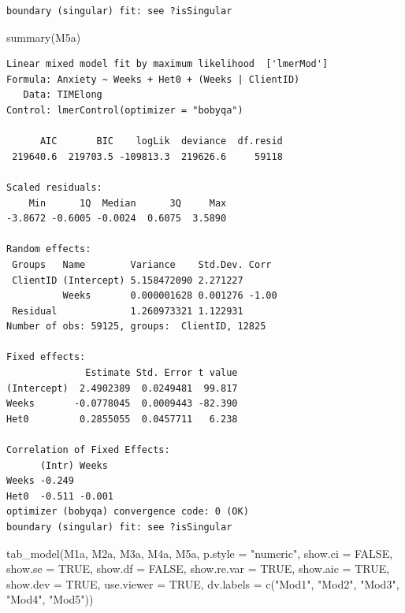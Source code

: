 \documentclass[
  english,
]{book}
\newenvironment{Shaded}{\begin{snugshade}}{\end{snugshade}}
\newcommand{\AttributeTok}[1]{\textcolor[rgb]{0.77,0.63,0.00}{#1}}
\newcommand{\ConstantTok}[1]{\textcolor[rgb]{0.00,0.00,0.00}{#1}}
\newcommand{\FunctionTok}[1]{\textcolor[rgb]{0.00,0.00,0.00}{#1}}
\newcommand{\NormalTok}[1]{#1}
\newcommand{\StringTok}[1]{\textcolor[rgb]{0.31,0.60,0.02}{#1}}
\begin{document}
\begin{verbatim}
boundary (singular) fit: see ?isSingular
\end{verbatim}

\begin{Shaded}
\begin{Highlighting}[]
\FunctionTok{summary}\NormalTok{(M5a)}
\end{Highlighting}
\end{Shaded}

\begin{verbatim}
Linear mixed model fit by maximum likelihood  ['lmerMod']
Formula: Anxiety ~ Weeks + Het0 + (Weeks | ClientID)
   Data: TIMElong
Control: lmerControl(optimizer = "bobyqa")

      AIC       BIC    logLik  deviance  df.resid 
 219640.6  219703.5 -109813.3  219626.6     59118 

Scaled residuals: 
    Min      1Q  Median      3Q     Max 
-3.8672 -0.6005 -0.0024  0.6075  3.5890 

Random effects:
 Groups   Name        Variance    Std.Dev. Corr 
 ClientID (Intercept) 5.158472090 2.271227      
          Weeks       0.000001628 0.001276 -1.00
 Residual             1.260973321 1.122931      
Number of obs: 59125, groups:  ClientID, 12825

Fixed effects:
              Estimate Std. Error t value
(Intercept)  2.4902389  0.0249481  99.817
Weeks       -0.0778045  0.0009443 -82.390
Het0         0.2855055  0.0457711   6.238

Correlation of Fixed Effects:
      (Intr) Weeks 
Weeks -0.249       
Het0  -0.511 -0.001
optimizer (bobyqa) convergence code: 0 (OK)
boundary (singular) fit: see ?isSingular
\end{verbatim}

\begin{Shaded}
\begin{Highlighting}[]
\FunctionTok{tab\_model}\NormalTok{(M1a, M2a, M3a, M4a, M5a, }\AttributeTok{p.style =} \StringTok{"numeric"}\NormalTok{, }\AttributeTok{show.ci =} \ConstantTok{FALSE}\NormalTok{, }\AttributeTok{show.se =} \ConstantTok{TRUE}\NormalTok{, }\AttributeTok{show.df =} \ConstantTok{FALSE}\NormalTok{, }\AttributeTok{show.re.var =} \ConstantTok{TRUE}\NormalTok{, }\AttributeTok{show.aic =} \ConstantTok{TRUE}\NormalTok{, }\AttributeTok{show.dev =} \ConstantTok{TRUE}\NormalTok{, }\AttributeTok{use.viewer =} \ConstantTok{TRUE}\NormalTok{, }\AttributeTok{dv.labels =} \FunctionTok{c}\NormalTok{(}\StringTok{"Mod1"}\NormalTok{, }\StringTok{"Mod2"}\NormalTok{, }\StringTok{"Mod3"}\NormalTok{, }\StringTok{"Mod4"}\NormalTok{, }\StringTok{"Mod5"}\NormalTok{))}
\end{Highlighting}
\end{Shaded}
\end{document}
